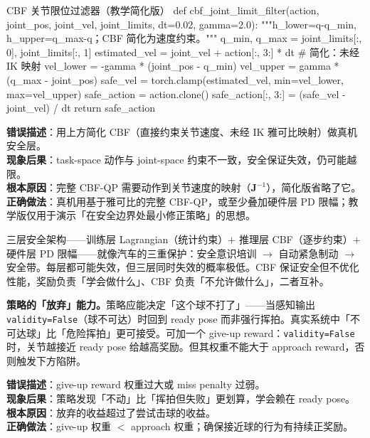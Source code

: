 \begin{codebox}[Python]{CBF 关节限位过滤器（教学简化版）}
def cbf_joint_limit_filter(action, joint_pos, joint_vel, joint_limits,
                           dt=0.02, gamma=2.0):
    """h_lower=q-q_min, h_upper=q_max-q；CBF 简化为速度约束。"""
    q_min, q_max = joint_limits[:, 0], joint_limits[:, 1]
    estimated_vel = joint_vel + action[:, 3:] * dt           # 简化：未经 IK 映射
    vel_lower = -gamma * (joint_pos - q_min)
    vel_upper = gamma * (q_max - joint_pos)
    safe_vel = torch.clamp(estimated_vel, min=vel_lower, max=vel_upper)
    safe_action = action.clone()
    safe_action[:, 3:] = (safe_vel - joint_vel) / dt
    return safe_action
\end{codebox}

\begin{pitfall}
\textbf{错误描述}：用上方简化 CBF（直接约束关节速度、未经 IK 雅可比映射）做真机安全层。\\
\textbf{现象后果}：task-space 动作与 joint-space 约束不一致，安全保证失效，仍可能越限。\\
\textbf{根本原因}：完整 CBF-QP 需要动作到关节速度的映射（$\mathbf{J}^{-1}$），简化版省略了它。\\
\textbf{正确做法}：真机用基于雅可比的完整 CBF-QP，或至少叠加硬件层 PD 限幅；教学版仅用于演示「在安全边界处最小修正策略」的思想。
\end{pitfall}

\begin{insight}\label{ins:rlmc-strike-three-layer-safety}
三层安全架构——训练层 Lagrangian（统计约束）$+$ 推理层 CBF（逐步约束）$+$ 硬件层 PD 限幅——就像汽车的三重保护：安全意识培训 $\to$ 自动紧急制动 $\to$ 安全带。每层都可能失效，但三层同时失效的概率极低。CBF 保证安全但不优化性能，奖励负责「学会做什么」、CBF 负责「不允许做什么」，二者互补。
\end{insight}

\textbf{策略的「放弃」能力。}策略应能决定「这个球不打了」——当感知输出 \verb|validity=False|（球不可达）时回到 ready pose 而非强行挥拍。真实系统中「不可达球」比「危险挥拍」更可接受。可加一个 give-up reward：\verb|validity=False| 时，关节越接近 ready pose 给越高奖励。但其权重不能大于 approach reward，否则触发下方陷阱。

\begin{pitfall}
\textbf{错误描述}：give-up reward 权重过大或 miss penalty 过弱。\\
\textbf{现象后果}：策略发现「不动」比「挥拍但失败」更划算，学会赖在 ready pose。\\
\textbf{根本原因}：放弃的收益超过了尝试击球的收益。\\
\textbf{正确做法}：give-up 权重 $<$ approach 权重；确保接近球的行为有持续正奖励。
\end{pitfall}

